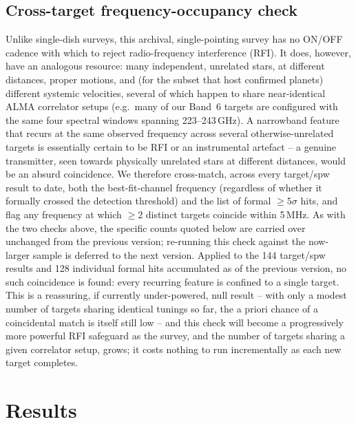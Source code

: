 \documentclass{openjournal}
\begin{document}
\subsection{Cross-target frequency-occupancy check}
\label{sec:freqoccupancy}

Unlike single-dish surveys, this archival, single-pointing survey has no
ON/OFF cadence with which to reject radio-frequency interference (RFI).
It does, however, have an analogous resource: many independent,
unrelated stars, at different distances, proper motions, and (for the
subset that host confirmed planets) different systemic velocities,
several of which happen to share near-identical ALMA correlator setups
(e.g.\ many of our Band~6 targets are configured with the same four
spectral windows spanning 223--243\,GHz). A narrowband feature that
recurs at the same observed frequency across several otherwise-unrelated
targets is essentially certain to be RFI or an instrumental artefact --
a genuine transmitter, seen towards physically unrelated stars at
different distances, would be an absurd coincidence. We therefore
cross-match, across every target/spw result to date, both the
best-fit-channel frequency (regardless of whether it formally crossed
the detection threshold) and the list of formal $\geq5\sigma$ hits, and
flag any frequency at which $\geq2$ distinct targets coincide within
5\,MHz. As with the two checks above, the specific counts quoted below
are carried over unchanged from the previous version; re-running this
check against the now-larger sample is deferred to the next version.
Applied to the 144 target/spw results and 128 individual formal
hits accumulated as of the previous version, no such coincidence is found: every recurring
feature is confined to a single target. This is a reassuring, if
currently under-powered, null result -- with only a modest number of
targets sharing identical tunings so far, the a priori chance of a
coincidental match is itself still low -- and this check will become a
progressively more powerful RFI safeguard as the survey, and the number
of targets sharing a given correlator setup, grows; it costs nothing to
run incrementally as each new target completes.

\section{Results}
\label{sec:results}
\end{document}
